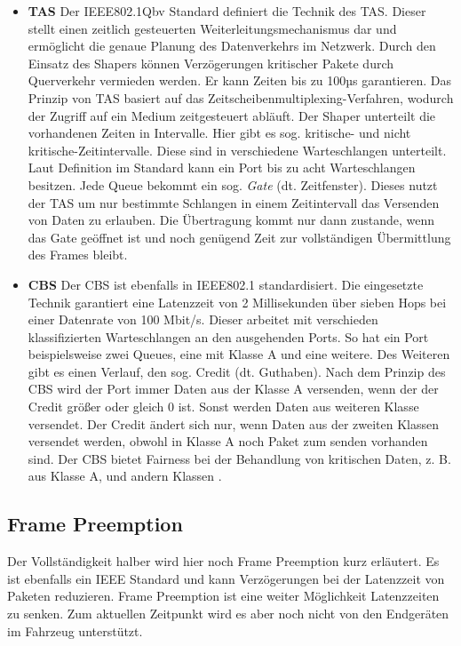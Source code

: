 \begin{itemize}
	\item \textbf{\ac{TAS}}
	\newline
	Der IEEE802.1Qbv Standard definiert die Technik des \ac{TAS}. Dieser stellt einen zeitlich gesteuerten Weiterleitungsmechanismus dar und ermöglicht die genaue Planung des Datenverkehrs im Netzwerk. Durch den Einsatz des Shapers können Verzögerungen kritischer Pakete durch Querverkehr vermieden werden. Er kann Zeiten bis zu 100µs garantieren. Das Prinzip von \ac{TAS} basiert auf das Zeitscheibenmultiplexing-Verfahren, wodurch der Zugriff auf ein Medium zeitgesteuert abläuft. Der Shaper unterteilt die vorhandenen Zeiten in Intervalle. Hier gibt es sog. kritische- und nicht kritische-Zeitintervalle. Diese sind in verschiedene Warteschlangen unterteilt.\newline
	Laut Definition im Standard kann ein Port bis zu acht Warteschlangen besitzen. Jede Queue bekommt ein sog. \emph{Gate} (dt. Zeitfenster). Dieses nutzt der \acs{TAS} um nur bestimmte Schlangen in einem Zeitintervall das Versenden von Daten zu erlauben. Die Übertragung kommt nur dann zustande, wenn das Gate geöffnet ist und noch genügend Zeit zur vollständigen Übermittlung des Frames bleibt.  
	
	\item \textbf{\ac{CBS}}
	\newline
	Der \acl{CBS} ist ebenfalls in IEEE802.1 standardisiert. Die eingesetzte Technik garantiert eine Latenzzeit von 2 Millisekunden über sieben Hops bei einer Datenrate von 100 Mbit/s. Dieser arbeitet mit verschieden klassifizierten Warteschlangen an den ausgehenden Ports. So hat ein Port beispielsweise zwei Queues, eine mit Klasse A und eine weitere. Des Weiteren gibt es einen Verlauf, den sog. Credit (dt. Guthaben). Nach dem Prinzip des \acl{CBS} wird der Port immer Daten aus der Klasse A versenden, wenn der der Credit größer oder gleich 0 ist. Sonst werden Daten aus weiteren Klasse versendet. Der Credit ändert sich nur, wenn Daten aus der zweiten Klassen versendet werden, obwohl in Klasse A noch Paket zum senden vorhanden sind. Der \ac{CBS} bietet Fairness bei der Behandlung von kritischen Daten, z. B.  aus Klasse A, und andern Klassen \cite{CreditBased}.
\end{itemize}
 
 \newpage
\subsection{Frame Preemption}
Der Vollständigkeit halber wird hier noch Frame Preemption kurz erläutert. Es ist ebenfalls ein IEEE Standard \cite{IEEE802_1Qbu} und kann Verzögerungen bei der Latenzzeit von Paketen reduzieren. Frame Preemption ist eine weiter Möglichkeit Latenzzeiten zu senken. Zum aktuellen Zeitpunkt wird es aber noch nicht von den Endgeräten im Fahrzeug unterstützt. 

